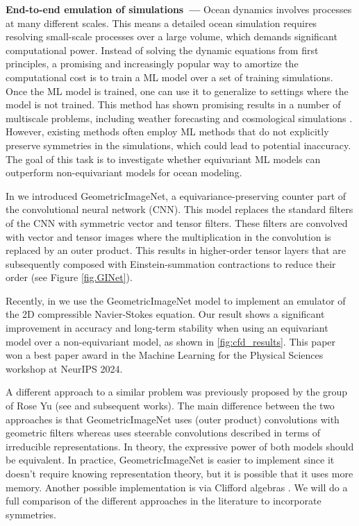 \documentclass[11pt]{article}
\renewcommand{\paragraph}[1]{\medskip\par\noindent\textbf{#1~---}}
\begin{document}
\paragraph{End-to-end emulation of simulations}
Ocean dynamics involves processes at many different scales. This means a detailed ocean simulation requires resolving small-scale processes over a large volume, which demands significant computational power.
Instead of solving the dynamic equations from first principles, a promising and increasingly popular way to amortize the computational cost is to train a ML model over a set of training simulations. Once the ML model is trained, one can use it to generalize to settings where the model is not trained. This method has shown promising results in a number of multiscale problems, including weather forecasting \cite{Pathak2022FourCastNetAG} and cosmological simulations \cite{CAMELS:2020cof}. However, existing methods often employ ML methods that do not explicitly preserve symmetries in the simulations, which could lead to potential inaccuracy. The goal of this task is to investigate whether equivariant ML models can outperform non-equivariant models for ocean modeling.

In \cite{Gregory2023EquivariantGC} we introduced GeometricImageNet, a equivariance-preserving counter part of the convolutional neural network (CNN). This model replaces the standard filters of the CNN with symmetric vector and tensor filters. These filters are convolved with vector and tensor images where the multiplication in the convolution is replaced by an outer product. This results in higher-order tensor layers that are subsequently composed with Einstein-summation contractions to reduce their order (see Figure \ref{fig.GINet}).  

Recently, in \cite{gregory2024robust} we use the GeometricImageNet model
to implement an emulator of the 2D compressible Navier-Stokes equation. Our result shows a significant improvement in accuracy and long-term stability when using an equivariant model over a non-equivariant model, as shown in \ref{fig:cfd_results}. This paper won a best paper award in the Machine Learning for the Physical Sciences workshop at NeurIPS 2024.

A different approach to a similar problem was previously proposed by the group of Rose Yu (see \cite{wang2021incorporating} and subsequent works). The main difference between the two approaches is that GeometricImageNet uses (outer product) convolutions with geometric filters whereas \cite{wang2021incorporating} uses steerable convolutions described in terms of irreducible representations. In theory, the expressive power of both models should be equivalent. In practice, GeometricImageNet is easier to implement since it doesn't require knowing representation theory, but it is possible that it uses more memory. Another possible implementation is via Clifford algebras \cite{brandstetter2023clifford}. We will do a full comparison of the different approaches in the literature to incorporate symmetries.
\end{document}
